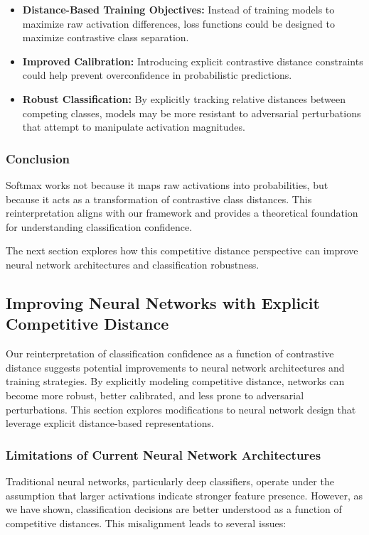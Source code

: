 \documentclass[12pt]{article}
\begin{document}
\begin{itemize}
    \item \textbf{Distance-Based Training Objectives:} Instead of training models to maximize raw activation differences, loss functions could be designed to maximize contrastive class separation.
    \item \textbf{Improved Calibration:} Introducing explicit contrastive distance constraints could help prevent overconfidence in probabilistic predictions.
    \item \textbf{Robust Classification:} By explicitly tracking relative distances between competing classes, models may be more resistant to adversarial perturbations that attempt to manipulate activation magnitudes.
\end{itemize}

\subsubsection{Conclusion}

Softmax works not because it maps raw activations into probabilities, but because it acts as a transformation of contrastive class distances. This reinterpretation aligns with our framework and provides a theoretical foundation for understanding classification confidence. 

The next section explores how this competitive distance perspective can improve neural network architectures and classification robustness.

\subsection{Improving Neural Networks with Explicit Competitive Distance}

Our reinterpretation of classification confidence as a function of contrastive distance suggests potential improvements to neural network architectures and training strategies. By explicitly modeling competitive distance, networks can become more robust, better calibrated, and less prone to adversarial perturbations. This section explores modifications to neural network design that leverage explicit distance-based representations.

\subsubsection{Limitations of Current Neural Network Architectures}

Traditional neural networks, particularly deep classifiers, operate under the assumption that larger activations indicate stronger feature presence. However, as we have shown, classification decisions are better understood as a function of competitive distances. This misalignment leads to several issues:
\end{document}
